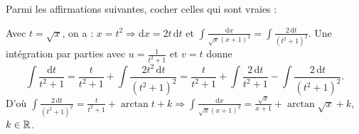 \begin{question}
Parmi les affirmations suivantes, cocher celles qui sont vraies :
\begin{answers}
\bad{Une primitive de $\displaystyle \frac{1}{\sqrt{x}(x+1)^2}$ sur $]0,+\infty[$ est $\displaystyle \frac{1}{2}\left(\frac{\sqrt{x}}{x+1}+\arctan \sqrt{x}\right)$.}
\end{answers}
\vskip2mm
\begin{explanations}
Avec $\displaystyle t=\sqrt{x}$, on a : $\displaystyle x=t^2\Rightarrow \mathrm{d}x=2t\, \mathrm{d}t$ et $\displaystyle \int \frac{\mathrm{d}x}{\sqrt{x}(x+1)^2}=\int \frac{2\, \mathrm{d}t}{(t^2+1)^2}$.
Une intégration par parties avec $\displaystyle u=\frac{1}{t^2+1}$ et $v=t$ donne
$$\int \frac{\mathrm{d}t}{t^2+1}=\frac{t}{t^2+1}+\int \frac{2t^2\, \mathrm{d}t}{(t^2+1)^2}=\frac{t}{t^2+1}+\int \frac{2\, \mathrm{d}t}{t^2+1}-\int \frac{2\, \mathrm{d}t}{(t^2+1)^2}.$$
D'où $\displaystyle \int \frac{2\, \mathrm{d}t}{(t^2+1)^2}=\frac{t}{t^2+1}+\arctan t+k\Rightarrow \int \frac{\mathrm{d}x}{\sqrt{x}(x+1)^2}=\frac{\sqrt{x}}{x+1}+\arctan \sqrt{x}+k$, $k\in \mathbb{R}$.
\end{explanations}
\end{question}

